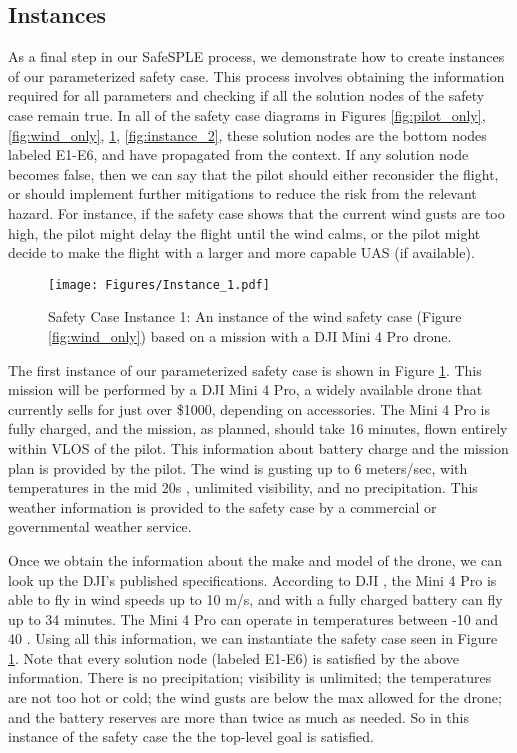 \subsection{Instances}
As a final step in our SafeSPLE process, we demonstrate how to create instances of our parameterized safety case. This process involves obtaining the information required for all parameters and checking if all the solution nodes of the safety case remain true. In all of the safety case diagrams in Figures \ref{fig:pilot_only}, \ref{fig:wind_only}, \ref{fig:instance_1}, \ref{fig:instance_2}, these solution nodes are the bottom nodes labeled E1-E6, and have propagated from the context. If any solution node becomes false, then we can say that the pilot should either reconsider the flight, or should implement further mitigations to reduce the risk from the relevant hazard. For instance, if the safety case shows that the current wind gusts are too high, the pilot might delay the flight until the wind calms, or the pilot might decide to make the flight with a larger and more capable UAS (if available).

\begin{figure}[ht]
    \centering
    \texttt{[image: Figures/Instance\_1.pdf]}
    \caption{Safety Case Instance 1: An instance of the wind safety case (Figure \ref{fig:wind_only}) based on a mission with a DJI Mini 4 Pro drone.}
    \label{fig:instance_1}
\end{figure}

The first instance of our parameterized safety case is shown in Figure \ref{fig:instance_1}. This mission will be performed by a DJI Mini 4 Pro, a widely available drone that currently sells for just over \$1000, depending on accessories. The Mini 4 Pro is fully charged, and the mission, as planned, should take 16 minutes, flown entirely within VLOS of the pilot. This information about battery charge and the mission plan is provided by the pilot. The wind is gusting up to 6 meters/sec, with temperatures in the mid 20s \textcelsius, unlimited visibility, and no precipitation. This weather information is provided to the safety case by a commercial or governmental weather service. 

Once we obtain the information about the make and model of the drone, we can look up the DJI's published specifications. According to DJI \cite{DJI_MiniPro_4_Specs}, the Mini 4 Pro is able to fly in wind speeds up to 10 m/s, and with a fully charged battery can fly up to 34 minutes. The Mini 4 Pro can operate in temperatures between -10 \textcelsius \;and 40 \textcelsius. Using all this information, we can instantiate the safety case seen in Figure \ref{fig:instance_1}. Note that every solution node 
(labeled E1-E6) is satisfied by the above information. There is no precipitation; visibility is unlimited; the temperatures are not too hot or cold; the wind gusts are below the max allowed for the drone; and the battery reserves are more than twice as much as needed. So in this instance of the safety case the the top-level goal is satisfied. 

